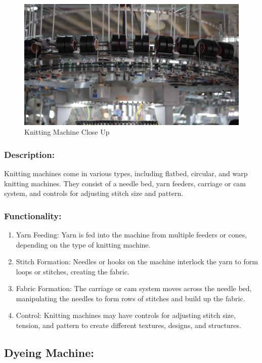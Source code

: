 \begin{figure}[h!]
  \centering
  \includegraphics[width=0.8\linewidth]{figs/knitting_closeup.jpg}
  \caption{Knitting Machine Close Up}
  \label{fig:Knitting Machine Close Up}
\end{figure}

\subsubsection{Description:}
Knitting machines come in various types, including flatbed, circular,
and warp knitting machines. They consist of a needle bed, yarn feeders,
carriage or cam system, and controls for adjusting stitch size and
pattern.


\subsubsection{Functionality:}

\begin{enumerate}
\item
  Yarn Feeding: Yarn is fed into the machine from multiple feeders or
  cones, depending on the type of knitting machine.
\item
  Stitch Formation: Needles or hooks on the machine interlock the yarn
  to form loops or stitches, creating the fabric.
\item
  Fabric Formation: The carriage or cam system moves across the needle
  bed, manipulating the needles to form rows of stitches and build up
  the fabric.
\item
  Control: Knitting machines may have controls for adjusting stitch
  size, tension, and pattern to create different textures, designs, and
  structures.
\end{enumerate}


\subsection{Dyeing Machine:\cite{dyeing_machines}}

